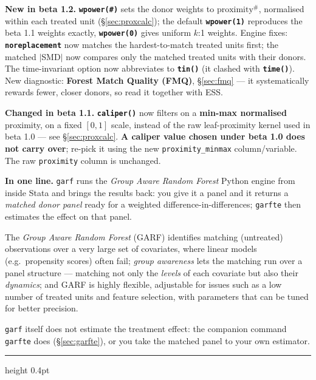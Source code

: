 \documentclass[11pt,a4paper]{article}
\newcommand{\opt}[1]{\texttt{\textbf{#1}}}
\newcommand{\code}[1]{\texttt{#1}}
\begin{document}
\begin{center}
{{\smallskip
\textbf{New in beta 1.2.} \opt{wpower(\#)} sets the donor weights to
$\text{proximity}^{\#}$, normalised within each treated unit (\S\ref{sec:proxcalc}); the default
\opt{wpower(1)} reproduces the beta 1.1 weights exactly, \opt{wpower(0)} gives uniform $k$:1
weights. Engine fixes: \opt{noreplacement} now matches the hardest-to-match treated units first;
the matched $|$SMD$|$ now compares only the matched treated units with their donors. The
time-invariant option now abbreviates to \opt{tin()} (it clashed with \opt{time()}). New
diagnostic: \textbf{Forest Match Quality (FMQ)}, \S\ref{sec:fmq} --- it systematically rewards fewer,
closer donors, so read it together with ESS.

\smallskip
\textbf{Changed in beta 1.1.} \opt{caliper()} now filters on a
\textbf{min-max normalised} proximity, on a fixed $[0,1]$ scale, instead of the raw
leaf-proximity kernel used in beta 1.0 --- see \S\ref{sec:proxcalc}. \textbf{A caliper value
chosen under beta 1.0 does not carry over}; re-pick it using the new \code{proximity\_minmax}
column/variable. The raw \code{proximity} column is unchanged.}}
\end{center}
\vspace{0.4em}

{\small
\textbf{In one line.} \code{garf} runs the \emph{Group Aware Random Forest} Python engine from
inside Stata and brings the results back: you give it a panel and it returns a \emph{matched
donor panel} ready for a weighted difference-in-differences; \code{garfte} then estimates the
effect on that panel.

\smallskip
\noindent The \emph{Group Aware Random Forest} (GARF) identifies matching (untreated)
observations over a very large set of covariates, where linear models (e.g.\ propensity scores)
often fail; \emph{group awareness} lets the matching run over a panel structure --- matching not
only the \emph{levels} of each covariate but also their \emph{dynamics}; and GARF is highly
flexible, adjustable for issues such as a low number of treated units and feature selection, with
parameters that can be tuned for better precision.

\smallskip
\noindent \code{garf} itself does not estimate the treatment effect: the companion command
\code{garfte} does (\S\ref{sec:garfte}), or you take the matched panel to your own estimator.}

\vspace{0.4em}
\hrule height 0.4pt
\vspace{0.8em}
\end{document}
